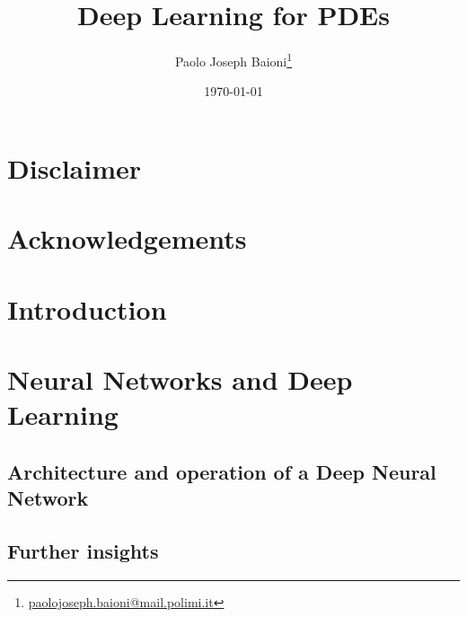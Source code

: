 \documentclass[12pt, a4paper]{report}
\title{\textbf{Deep Learning for PDEs}}
\author{Paolo Joseph Baioni\renewcommand{\thefootnote}{\fnsymbol{footnote}}\footnote{\href{mailto:paolojoseph.baioni@mail.polimi.it}{paolojoseph.baioni@mail.polimi.it}}}
\date{\today}
\theoremstyle{definition}
\begin{document}
	
\maketitle




\chapter*{Disclaimer}
\renewcommand*{\thefootnote}{\arabic{footnote}}
\setcounter{footnote}{0}

	
	

\chapter*{Acknowledgements}


	
\tableofcontents
\clearpage
	

\chapter*{Introduction}




\chapter{Neural Networks and Deep Learning}\label{chapter1}

\section{Architecture and operation of a Deep Neural Network}\label{section1.1}

\section{Further insights}\label{section1.2}
\end{document}
